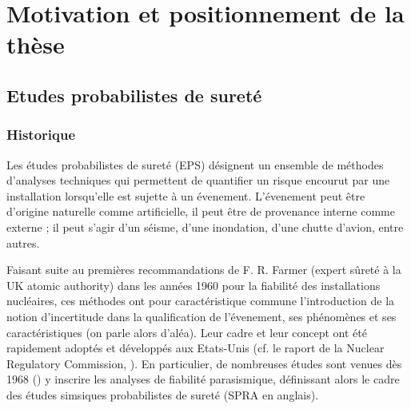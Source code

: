 \section{Motivation et positionnement de la thèse}

\subsection{Etudes probabilistes de sureté}
%

\subsubsection{Historique}

Les études probabilistes de sureté (EPS) désignent un ensemble de méthodes d'analyses techniques qui permettent de quantifier un risque encourut par une installation lorsqu'elle est sujette à un évenement. L'évenement peut être d'origine naturelle comme artificielle, il peut être de provenance interne comme externe ; il peut s'agir d'un séisme, d'une inondation, d'une chutte d'avion, entre autres.  %

Faisant suite au premières recommandations de F. R. Farmer (expert sûreté à la UK atomic authority) dans les années 1960 pour la fiabilité des installations nucléaires,
ces méthodes ont pour caractéristique commune l'introduction de la notion d'incertitude dans la qualification de l'évenement, ses phénomènes et ses caractéristiques (on parle alors d'aléa).
%
%
Leur cadre et leur concept ont été rapidement adoptés et développés aux Etats-Unis (cf. le raport de la Nuclear Regulatory Commission, \cite{nrc_pra_1983}). En particulier, de nombreuses études sont venues dès 1968 (\cite{cornell_engineering_1968}) 
y inscrire les analyses de fiabilité parasismique, définissant alors le cadre des études simsiques probabilistes de sureté (SPRA en anglais). %



